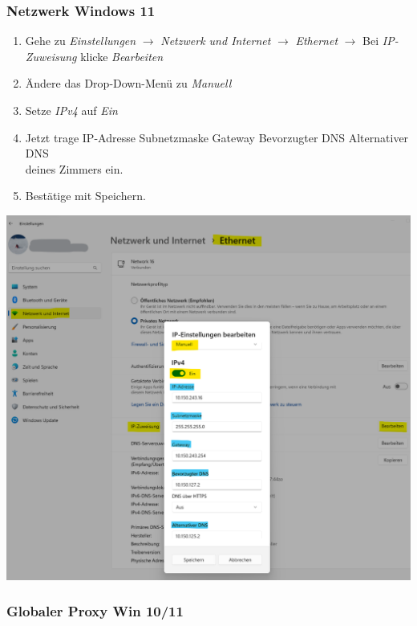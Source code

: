 \documentclass[a4paper,12pt]{scrartcl}
\begin{document}
\subsubsection*{Netzwerk Windows 11}
\begin{minipage}{0.6\textwidth}
\begin{enumerate}
	\item Gehe zu \textit{Einstellungen} $\rightarrow$ \textit{Netzwerk und Internet} $\rightarrow$ \textit{Ethernet} $\rightarrow$ Bei \textit{IP-Zuweisung} klicke \textit{Bearbeiten}
	\item Ändere das Drop-Down-Menü zu \textit{Manuell}
	\item Setze \textit{IPv4} auf \textit{Ein}
	\item Jetzt trage
		\subitem IP-Adresse
		\subitem Subnetzmaske
		\subitem Gateway
		\subitem Bevorzugter DNS
		\subitem Alternativer DNS \\
	deines Zimmers ein.
	\item Bestätige mit Speichern.
\end{enumerate}
\end{minipage}
\begin{minipage}{0.4\textwidth}
\includegraphics[width=\linewidth]{Bilder/Win11/ip_win11_de}
\end{minipage}

\subsubsection*{Globaler Proxy Win 10/11}
\end{document}
